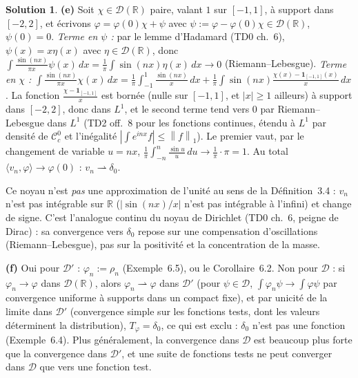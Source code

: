 \documentclass[11pt,a4paper]{article}
\newcommand{\R}{\mathbb{R}}
\newcommand{\norm}[1]{\left\|#1\right\|}
\newcommand{\Cc}{\mathcal{C}^0_c}
\newcommand{\wk}{\rightharpoonup}
\newcommand{\D}{\mathcal{D}}
\theoremstyle{definition}
\newtheorem*{solution}{Solution}
\begin{document}
\begin{solution}
\medskip
\noindent\textbf{(e)} Soit $\chi\in\D(\R)$ paire, valant $1$ sur $[-1,1]$, à support dans $[-2,2]$, et écrivons $\varphi=\varphi(0)\chi+\psi$ avec $\psi:=\varphi-\varphi(0)\chi\in\D(\R)$, $\psi(0)=0$. \emph{Terme en $\psi$ :} par le lemme d'Hadamard (TD0 ch.~6), $\psi(x)=x\eta(x)$ avec $\eta\in\D(\R)$, donc $\int\frac{\sin(nx)}{\pi x}\psi(x)\,dx=\frac1\pi\int\sin(nx)\eta(x)\,dx\to0$ (Riemann--Lebesgue). \emph{Terme en $\chi$ :} $\int\frac{\sin(nx)}{\pi x}\chi(x)\,dx=\frac1\pi\int_{-1}^1\frac{\sin(nx)}x\,dx+\frac1\pi\int\sin(nx)\frac{\chi(x)-\mathbf 1_{[-1,1]}(x)}x\,dx$. La fonction $\frac{\chi-\mathbf 1_{[-1,1]}}x$ est bornée (nulle sur $[-1,1]$, et $|x|\ge1$ ailleurs) à support dans $[-2,2]$, donc dans $L^1$, et le second terme tend vers $0$ par Riemann--Lebesgue dans $L^1$ (TD2 off.~8 pour les fonctions continues, étendu à $L^1$ par densité de $\Cc$ et l'inégalité $|\int e^{inx}f|\le\norm f_1$). Le premier vaut, par le changement de variable $u=nx$, $\frac1\pi\int_{-n}^n\frac{\sin u}u\,du\to\frac1\pi\cdot\pi=1$. Au total $\langle v_n,\varphi\rangle\to\varphi(0)$ : $v_n\wk\delta_0$.

Ce noyau n'est \emph{pas} une approximation de l'unité au sens de la Définition~3.4 : $v_n$ n'est pas intégrable sur $\R$ ($|\sin(nx)/x|$ n'est pas intégrable à l'infini) et change de signe. C'est l'analogue continu du noyau de Dirichlet (TD0 ch.~6, peigne de Dirac) : sa convergence vers $\delta_0$ repose sur une compensation d'oscillations (Riemann--Lebesgue), pas sur la positivité et la concentration de la masse.

\medskip
\noindent\textbf{(f)} Oui pour $\D'$ : $\varphi_n:=\rho_n$ (Exemple~6.5), ou le Corollaire~6.2. Non pour $\D$ : si $\varphi_n\to\varphi$ dans $\D(\R)$, alors $\varphi_n\wk\varphi$ dans $\D'$ (pour $\psi\in\D$, $\int\varphi_n\psi\to\int\varphi\psi$ par convergence uniforme à supports dans un compact fixe), et par unicité de la limite dans $\D'$ (convergence simple sur les fonctions tests, dont les valeurs déterminent la distribution), $T_\varphi=\delta_0$, ce qui est exclu : $\delta_0$ n'est pas une fonction (Exemple~6.4). Plus généralement, la convergence dans $\D$ est beaucoup plus forte que la convergence dans $\D'$, et une suite de fonctions tests ne peut converger dans $\D$ que vers une fonction test.
\end{solution}
\end{document}
